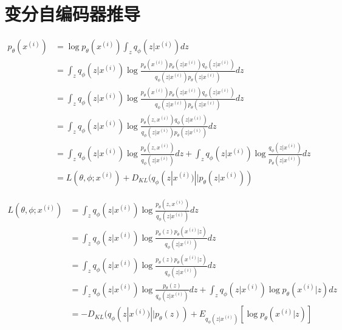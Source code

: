 \documentclass{ctexart}
\begin{document}
\section{变分自编码器推导}
\begin{align*}
p_\theta (x^{(i)})
&=\log p_\theta (x^{(i)}) \int_z q_{\phi}  (z | x^{(i)}) dz\\
&=  \int_z q_{\phi}  (z | x^{(i)}) \log \frac{p_\theta (x^{(i)}) p_{\theta}  (z | x^{(i)}) q_{\phi}  (z | x^{(i)})}{q_{\phi}  (z | x^{(i)}) p_{\theta}  (z | x^{(i)})} dz\\
&=  \int_z q_{\phi}  (z | x^{(i)}) \log \frac{p_\theta (x^{(i)}) p_{\theta}  (z | x^{(i)}) q_{\phi}  (z | x^{(i)})}{q_{\phi}  (z | x^{(i)}) p_{\theta}  (z | x^{(i)})} dz\\
&=  \int_z q_{\phi}  (z | x^{(i)}) \log \frac{p_\theta (z,x^{(i)}) q_{\phi}(z | x^{(i)}) }{ q_{\phi}  (z | x^{(i)}) p_{\theta}  (z | x^{(i)})} dz\\
&= \int_z q_{\phi}(z | x^{(i)}) \log \frac{p_\theta (z,x^{(i)})}{ q_{\phi}(z | x^{(i)})} dz + \int_z q_{\phi}(z | x^{(i)}) \log \frac{q_\phi (z | x^{(i)})}{ p_{\theta}(z | x^{(i)})} dz\\
&= L(\theta, \phi; x^{(i)}) + D_{KL}(q_{\phi}(z | x^{(i)}) || p_{\theta}  (z | x^{(i)}))
\end{align*}

\begin{align*}
L(\theta, \phi; x^{(i)})
&= \int_z q_{\phi}(z | x^{(i)}) \log \frac{p_\theta (z,x^{(i)})}{ q_{\phi}(z | x^{(i)})} dz\\
&= \int_z q_{\phi}(z | x^{(i)}) \log \frac{p_\theta (z) p_\theta (x^{(i)} | z)}{ q_{\phi}(z | x^{(i)})} dz\\
&= \int_z q_{\phi}(z | x^{(i)}) \log \frac{p_\theta (z) p_\theta (x^{(i)} | z)}{ q_{\phi}(z | x^{(i)})} dz \\
&= \int_z q_{\phi}(z | x^{(i)}) \log \frac{p_\theta (z) }{ q_{\phi}(z | x^{(i)})} dz +  \int_z q_{\phi}(z | x^{(i)}) \log p_\theta (x^{(i)} | z) dz \\
&= -D_{KL}(q_{\phi}(z | x^{(i)}) || p_\theta (z)) + E_{q_{\phi}(z | x^{(i)})}[\log p_\theta (x^{(i)} | z) ]
\end{align*}
\end{document}
